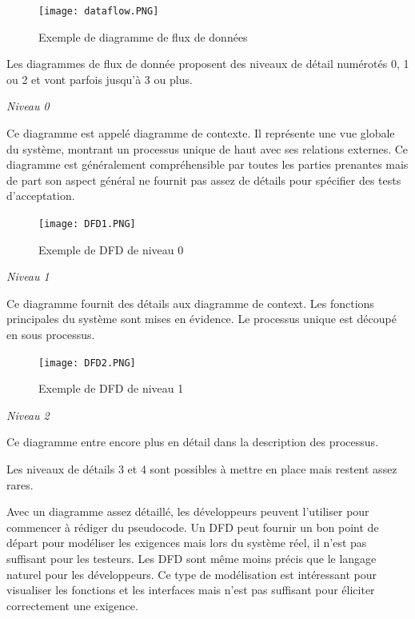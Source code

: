     \begin{figure}[H]
        \centering
        \texttt{[image: dataflow.PNG]}
        \caption{Exemple de diagramme de flux de données}
    \end{figure}
    
    Les diagrammes de flux de donnée proposent des niveaux de détail numérotés 0, 1 ou 2 et vont parfois jusqu'à 3 ou plus.

    \textit{Niveau 0}
    
    Ce diagramme est appelé diagramme de contexte. Il représente une vue globale du système, montrant un processus unique de haut avec ses relations externes. Ce diagramme est généralement compréhensible par toutes les parties prenantes  mais de part son aspect général ne fournit pas assez de détails pour spécifier des tests d'acceptation. 
    \begin{figure}[H]
            \centering
            \texttt{[image: DFD1.PNG]}
            \caption{Exemple de DFD de niveau 0}
        \end{figure}
        
    \textit{Niveau 1}

    Ce diagramme fournit des détails aux diagramme de context. Les fonctions principales du système sont mises en évidence. Le processus unique est découpé en sous processus.

    \begin{figure}[H]
        \centering
        \texttt{[image: DFD2.PNG]}
        \caption{Exemple de DFD de niveau 1}
    \end{figure}
\textit{Niveau 2}
    
    Ce diagramme entre encore plus en détail dans la description des processus. 
    
    Les niveaux de détails 3 et 4 sont possibles à mettre en place mais restent assez rares. 
    
    Avec un diagramme assez détaillé, les développeurs peuvent l'utiliser pour commencer à rédiger du pseudocode. Un DFD peut fournir un bon point de départ pour modéliser les exigences mais lors du système réel, il n'est pas suffisant pour les testeurs. Les DFD sont même moins précis que le langage naturel pour les développeurs. Ce type de modélisation est intéressant pour visualiser les fonctions et les interfaces mais n'est pas suffisant pour éliciter correctement une exigence. \cite{livre4}

